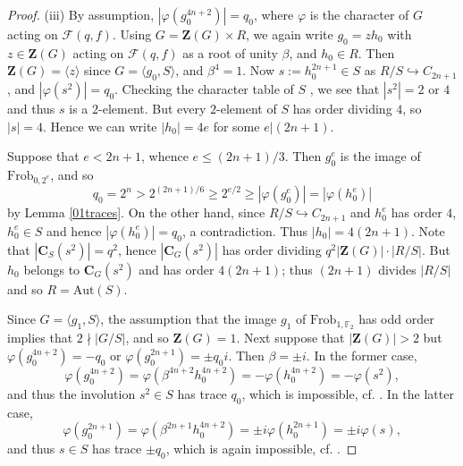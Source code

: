 \documentclass[11pt]{amsart}
\theoremstyle{plain}
\theoremstyle{definition}
\numberwithin{thm}{section}
\numberwithin{equation}{thm}
\newcommand{\Aut}{\mathrm{Aut}}
\newcommand{\sF}{{\mathcal F}}
\newcommand{\F}{{\mathbb F}}
\newcommand{\0}{\emptyset}
\newcommand{\ZB}{{\mathbf Z}}
\newcommand{\CB}{{\mathbf C}}
\newcommand{\Frob}{\mathrm{Frob}}
\begin{document}
\begin{proof}
\smallskip
(iii) By assumption, $|\varphi(g_0^{4n+2})| = q_0$, where $\varphi$ is the 
character of $G$ acting on $\sF(q,f)$. Using $G = \ZB(G) \times R$, we again write $g_0 = zh_0$
with $z \in \ZB(G)$ acting on $\sF(q,f)$ as a root of unity $\beta$, and $h_0 \in R$. Then $\ZB(G) = \langle z \rangle$ since  
$G = \langle g_0,S \rangle$, and $\beta^4=1$. Now $s:=h_0^{2n+1} \in S$ as $R/S \hookrightarrow C_{2n+1}$,  
and $|\varphi(s^2)| = q_0$. Checking the character table of $S$ \cite{Bur}, we see that
$|s^2|=2$ or $4$ and thus $s$ is a $2$-element. But every $2$-element of $S$ has order dividing $4$, so $|s|=4$. 
Hence we can write $|h_0| = 4e$ for some $e|(2n+1)$. 

Suppose that $e < 2n+1$, whence $e \leq (2n+1)/3$. Then $g_0^e$ is the image of $\Frob_{0,2^e}$, and so
$$q_0 =2^n > 2^{(2n+1)/6} \geq 2^{e/2} \geq |\varphi(g_0^e)| = |\varphi(h_0^e)|$$ 
by Lemma \ref{01traces}. 
On the other hand, since $R/S \hookrightarrow C_{2n+1}$ and $h_0^e$ has order $4$,
$h_0^e \in S$ and hence $|\varphi(h_0^e)| = q_0$, a contradiction. Thus $|h_0| = 4(2n+1)$. Note that $|\CB_S(s^2)| = q^2$, hence 
$|\CB_G(s^2)|$ has order dividing $q^2|\ZB(G)| \cdot |R/S|$. But $h_0$ belongs to $\CB_G(s^2)$ and has order $4(2n+1)$; thus
$(2n+1)$ divides $|R/S|$ and so $R=\Aut(S)$. 

Since $G=\langle g_1,S \rangle$, the assumption that the image $g_1$ of $\Frob_{1,\F_2}$ has odd order implies 
that $2 \nmid |G/S|$, and so $\ZB(G)=1$.  Next suppose that $|\ZB(G)| > 2$ but $\varphi(g_0^{4n+2}) = -q_0$ or 
$\varphi(g_0^{2n+1}) = \pm q_0i$. Then $\beta = \pm i$. In the former case,   
$$\varphi(g_0^{4n+2}) = \varphi(\beta^{4n+2}h_0^{4n+2}) = -\varphi(h_0^{4n+2}) = -\varphi(s^2),$$ 
and thus the involution $s^2 \in S$ has 
trace $q_0$, which is impossible, cf. \cite{Bur}. In the latter case,   
$$\varphi(g_0^{2n+1}) = \varphi(\beta^{2n+1}h_0^{4n+2}) =  \pm i \varphi(h_0^{2n+1}) = \pm i \varphi(s),$$
and thus $s \in S$ has 
trace $\pm q_0$, which is again impossible, cf. \cite{Bur}. 
\end{proof} 
\end{document}
